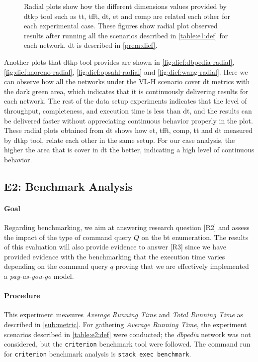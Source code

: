 \begin{figure}[!htp]
\begin{subfigure}[t]{0.45\textwidth}
    \label{fig:dief:wang-radial}
  \end{subfigure}
  \caption[{[EE] \acrshort{dt} General Results (Radial)}]{Radial plots show how the different dimensions values provided by \acrshort{dtkp} tool such as \acrshort{tt}, \acrshort{tfft}, \acrshort{dt}, \acrshort{et} and \acrshort{comp} are related each other for each experimental case. These figures show radial plot observed results after running all the scenarios described in \autoref{table:e1:def} for each network. \acrshort{dt} is described in \autoref{prem:dief}.}
\end{figure}

Another plots that \acrshort{dtkp} tool provides are shown in \autoref{fig:dief:dbpedia-radial}, \autoref{fig:dief:moreno-radial}, \autoref{fig:dief:opsahl-radial} and \autoref{fig:dief:wang-radial}.
Here we can observe how all the networks under the VL-H scenario cover \acrshort{dt} metrics with the dark green area, which indicates that it is continuously delivering results for each network. 
The rest of the data setup experiments indicates that the level of throughput, completeness, and execution time is less than \acrlong{dt}, and the results can be delivered faster without appreciating continuous behavior properly in the plot. 
These radial plots obtained from \acrshort{dt} shows how \acrshort{et}, \acrshort{tfft}, \acrshort{comp}, \acrshort{tt} and \acrshort{dt} measured by \acrshort{dtkp} tool, relate each other in the same setup. 
For our case analysis, the higher the area that is cover in \acrlong{dt} the better, indicating a high level of continuous behavior.

\subsection{E2: Benchmark Analysis}\label{sub:sec:exp-2} 
\paragraph{Goal} Regarding benchmarking, we aim at answering research question [R2] and assess  the impact of the type of command query $Q$ on the  \acrshort{bt} enumeration.
The results of this evaluation will also provide evidence to answer [R3] since we have provided evidence with the benchmarking that the execution time varies depending on the command query $q$ proving that we are effectively implemented a \emph{pay-as-you-go} model. 

\paragraph{Procedure} This experiment measures \emph{Average Running Time} and \emph{Total Running Time} as  described in \autoref{sub:metric}. 
For gathering \emph{Average Running Time}, the experiment scenarios described in \autoref{table:e2:def} were conducted; the \emph{\acrshort{dbpedia}} network was not considered, but the \texttt{criterion} \cite{criterion} benchmark tool were followed.
The command run for \texttt{criterion} benchmark analysis is \texttt{stack exec benchmark}. 

